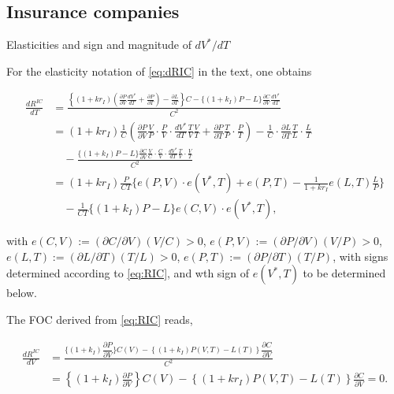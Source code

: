 \subsection{Insurance companies}
\label{sec:insurance_companies}
Elasticities and sign and magnitude of $dV^* / dT$

For the elasticity notation of \autoref{eq:dRIC} in the text, one obtains


\begin{align}
\frac{dR^{IC}}{dT} &= 
\frac{\left\{ 
    (1 + kr_I) 
    \left( 
        \frac{\partial P}{\partial V} \frac{dV^*}{dT} + \frac{\partial P}{\partial T} \right)- \frac{\partial L}{\partial T} 
    \right\}
    C - \{(1 + k_I)P - L\} \frac{\partial C}{\partial V} \frac{dV^*}{dT} 
}{C^2} \nonumber \\[10pt]
&= (1+kr_I)\frac{1}{C} 
\left( 
    \frac{\partial P}{\partial V} \frac{V}{P} \cdot \frac{P}{V}\cdot \frac{dV^*}{dT}\frac{T}{V}\frac{V}{T} + \frac{\partial P}{\partial T} \frac{T}{P} \cdot \frac{P}{T}
\right) 
- \frac{1}{C}\cdot \frac{\partial L}{\partial T}\frac{T}{L}\cdot \frac{L}{T} \nonumber \\[10pt]
& \quad - \frac{\{ (1 + k_I) P - L\}
\frac{\partial C}{\partial V} \frac{V}{C} \cdot \frac{C}{V}\cdot \frac{dV^*}{dT}\frac{T}{V} \cdot \frac{V}{T} }{C^2} \nonumber \\[10pt]
&= (1 + kr_I) \frac{P}{C T} 
\bigg\{ 
    e(P, V) \cdot e(V^*, T) + e(P, T) - \frac{1}{1 + kr_I} e(L, T) \frac{L}{P} 
\bigg\} \nonumber \\[10pt]
&\quad - \frac{1}{C T} 
\{(1 + k_I) P - L \} 
e(C, V) \cdot e(V^*, T), \label{eq:A_dRIC}
\end{align}


\noindent with $e(C,V):= (\partial C / \partial V)(V/C)>0$, $e(P,V):= (\partial P / \partial V)(V/P)>0$, $e(L,T):= (\partial L / \partial T)(T/L)>0$, $e(P,T):= (\partial P / \partial T)(T/P)$, with signs determined according to \autoref{eq:RIC}, and wth sign of $e(V^*,T)$ to be determined below. 

The FOC derived from \autoref{eq:RIC} reads,

\begin{align}
\frac{dR^{IC}}{dV} &= 
\frac{\bigg\{ (1 + k_I) \dfrac{\partial P}{\partial V} \bigg\} C(V) - \left\{ (1 + k_I) P(V, T) - L(T) \right\} \dfrac{\partial C}{\partial V}}{C^2} \nonumber\\[10pt]
&= \left\{ (1 + k_I) \frac{\partial P}{\partial V} \right\} C(V) - \left\{ (1 + kr_I) P(V, T) - L(T) \right\} \frac{\partial C}{\partial V} = 0. \label{eq:A.9}
\end{align}

